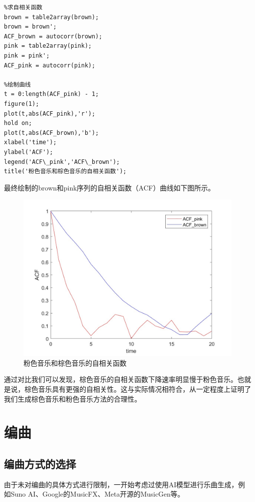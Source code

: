 \documentclass[a4paper,12pt]{article} %
\begin{document}
\begin{lstlisting}
%求自相关函数
brown = table2array(brown);
brown = brown';
ACF_brown = autocorr(brown);
pink = table2array(pink);
pink = pink';
ACF_pink = autocorr(pink);

%绘制曲线
t = 0:length(ACF_pink) - 1;
figure(1);
plot(t,abs(ACF_pink),'r');
hold on;
plot(t,abs(ACF_brown),'b');
xlabel('time');
ylabel('ACF');
legend('ACF\_pink','ACF\_brown');
title('粉色音乐和棕色音乐的自相关函数');
\end{lstlisting}
    最终绘制的brown和pink序列的自相关函数（ACF）曲线如下图所示。\par
\begin{figure}[htp]
\centering
\includegraphics[width=0.8\linewidth]{ACF1.jpg}
\caption{粉色音乐和棕色音乐的自相关函数}
\label{}
\end{figure}
   通过对比我们可以发现，棕色音乐的自相关函数下降速率明显慢于粉色音乐。也就是说，棕色音乐具有更强的自相关性。这与实际情况相符合，从一定程度上证明了我们生成棕色音乐和粉色音乐方法的合理性。 \par

\section{编曲}\label{ptxvsx86}
\subsection{编曲方式的选择}
由于未对编曲的具体方式进行限制，一开始考虑过使用AI模型进行乐曲生成，例如Suno AI、Google的MusicFX、Meta开源的MusicGen等。
\end{document}
